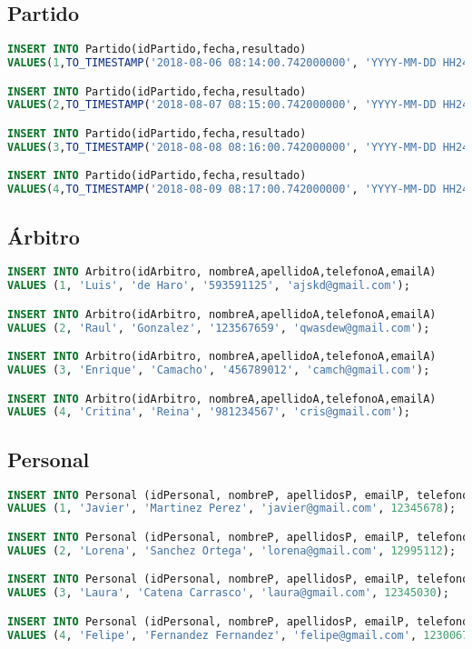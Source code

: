 \subsection{Partido}
\begin{lstlisting}[language=sql]
INSERT INTO Partido(idPartido,fecha,resultado)
VALUES(1,TO_TIMESTAMP('2018-08-06 08:14:00.742000000', 'YYYY-MM-DD HH24:MI:SS.FF'),15);

INSERT INTO Partido(idPartido,fecha,resultado)
VALUES(2,TO_TIMESTAMP('2018-08-07 08:15:00.742000000', 'YYYY-MM-DD HH24:MI:SS.FF'),17);

INSERT INTO Partido(idPartido,fecha,resultado)
VALUES(3,TO_TIMESTAMP('2018-08-08 08:16:00.742000000', 'YYYY-MM-DD HH24:MI:SS.FF'),18);

INSERT INTO Partido(idPartido,fecha,resultado)
VALUES(4,TO_TIMESTAMP('2018-08-09 08:17:00.742000000', 'YYYY-MM-DD HH24:MI:SS.FF'),19);

\end{lstlisting}

\pagebreak

\subsection{Árbitro}
\begin{lstlisting}[language=sql]
INSERT INTO Arbitro(idArbitro, nombreA,apellidoA,telefonoA,emailA)
VALUES (1, 'Luis', 'de Haro', '593591125', 'ajskd@gmail.com');

INSERT INTO Arbitro(idArbitro, nombreA,apellidoA,telefonoA,emailA)
VALUES (2, 'Raul', 'Gonzalez', '123567659', 'qwasdew@gmail.com');

INSERT INTO Arbitro(idArbitro, nombreA,apellidoA,telefonoA,emailA)
VALUES (3, 'Enrique', 'Camacho', '456789012', 'camch@gmail.com');

INSERT INTO Arbitro(idArbitro, nombreA,apellidoA,telefonoA,emailA)
VALUES (4, 'Critina', 'Reina', '981234567', 'cris@gmail.com');
\end{lstlisting}

\subsection{Personal}
\begin{lstlisting}[language=sql]
INSERT INTO Personal (idPersonal, nombreP, apellidosP, emailP, telefonoP)
VALUES (1, 'Javier', 'Martinez Perez', 'javier@gmail.com', 12345678);

INSERT INTO Personal (idPersonal, nombreP, apellidosP, emailP, telefonoP)
VALUES (2, 'Lorena', 'Sanchez Ortega', 'lorena@gmail.com', 12995112);

INSERT INTO Personal (idPersonal, nombreP, apellidosP, emailP, telefonoP)
VALUES (3, 'Laura', 'Catena Carrasco', 'laura@gmail.com', 12345030);

INSERT INTO Personal (idPersonal, nombreP, apellidosP, emailP, telefonoP)
VALUES (4, 'Felipe', 'Fernandez Fernandez', 'felipe@gmail.com', 12300678);
\end{lstlisting}

